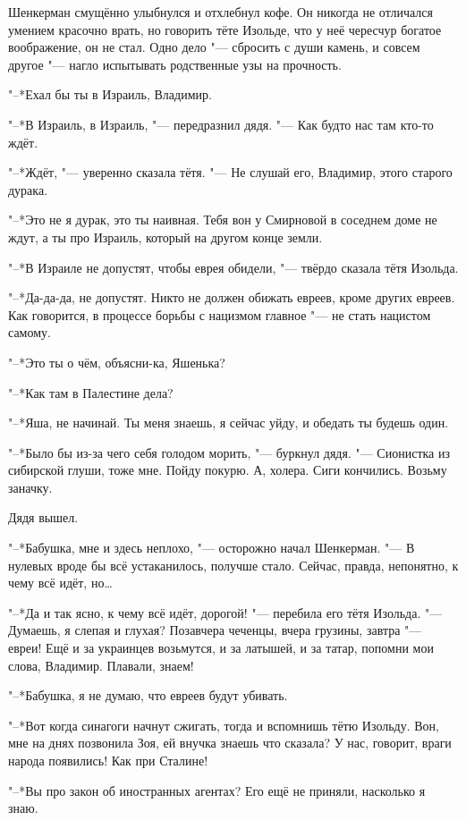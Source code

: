 Шенкерман смущённо улыбнулся и отхлебнул кофе.
Он никогда не отличался умением красочно врать, но говорить тёте Изольде, что у неё чересчур богатое воображение, он не стал.
Одно дело "--- сбросить с души камень, и совсем другое "--- нагло испытывать родственные узы на прочность.

\textspace

"--*Ехал бы ты в Израиль, Владимир.

"--*В Израиль, в Израиль, "--- передразнил дядя.
"--- Как будто нас там кто-то ждёт.

"--*Ждёт, "--- уверенно сказала тётя.
"--- Не слушай его, Владимир, этого старого дурака.

"--*Это не я дурак, это ты наивная.
Тебя вон у Смирновой в соседнем доме не ждут, а ты про Израиль, который на другом конце земли.

"--*В Израиле не допустят, чтобы еврея обидели, "--- твёрдо сказала тётя Изольда.

"--*Да-да-да, не допустят.
Никто не должен обижать евреев, кроме других евреев.
Как говорится, в процессе борьбы с нацизмом главное "--- не стать нацистом самому.

"--*Это ты о чём, объясни-ка, Яшенька?

"--*Как там в Палестине дела?

"--*Яша, не начинай.
Ты меня знаешь, я сейчас уйду, и обедать ты будешь один.

"--*Было бы из-за чего себя голодом морить, "--- буркнул дядя.
"--- Сионистка из сибирской глуши, тоже мне.
Пойду покурю.
А, холера.
Сиги кончились.
Возьму заначку.

Дядя вышел.

"--*Бабушка, мне и здесь неплохо, "--- осторожно начал Шенкерман.
"--- В нулевых вроде бы всё устаканилось, получше стало.
Сейчас, правда, непонятно, к чему всё идёт, но\dots{}

"--*Да и так ясно, к чему всё идёт, дорогой! "--- перебила его тётя Изольда.
"--- Думаешь, я слепая и глухая?
Позавчера чеченцы, вчера грузины, завтра "--- евреи!
Ещё и за украинцев возьмутся, и за латышей, и за татар, попомни мои слова, Владимир.
Плавали, знаем!

"--*Бабушка, я не думаю, что евреев будут убивать.

"--*Вот когда синагоги начнут сжигать, тогда и вспомнишь тётю Изольду.
Вон, мне на днях позвонила Зоя, ей внучка знаешь что сказала?
У нас, говорит, враги народа появились!
Как при Сталине!

"--*Вы про закон об иностранных агентах?
Его ещё не приняли, насколько я знаю.

